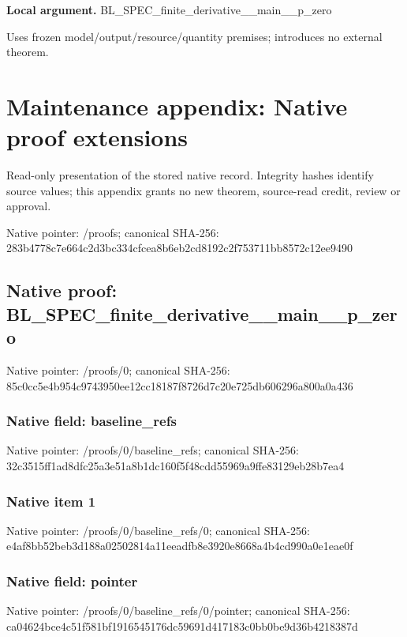 \documentclass[10pt,a4paper]{article}
\begin{document}
\textbf{Local argument.} BL\_\allowbreak{}SPEC\_\allowbreak{}finite\_\allowbreak{}derivative\_\allowbreak{}\_\allowbreak{}main\_\allowbreak{}\_\allowbreak{}p\_\allowbreak{}zero

Uses frozen model/output/resource/quantity premises; introduces no external theorem.

\section{Maintenance appendix: Native proof extensions}
Read-only presentation of the stored native record. Integrity hashes identify source values; this appendix grants no new theorem, source-read credit, review or approval.

Native pointer: /proofs; canonical SHA-256: 283b4778c7e664c2d3bc334cfcea8b6eb2cd8192c2f753711bb8572c12ee9490

\subsection{Native proof: BL\_\allowbreak{}SPEC\_\allowbreak{}finite\_\allowbreak{}derivative\_\allowbreak{}\_\allowbreak{}main\_\allowbreak{}\_\allowbreak{}p\_\allowbreak{}zero}
Native pointer: /proofs/0; canonical SHA-256: 85c0cc5e4b954c9743950ee12cc18187f8726d7c20e725db606296a800a0a436

\subsubsection{Native field: baseline\_\allowbreak{}refs}
Native pointer: /proofs/0/baseline\_\allowbreak{}refs; canonical SHA-256: 32c3515ff1ad8dfc25a3e51a8b1dc160f5f48cdd55969a9ffe83129eb28b7ea4

\subsubsection{Native item 1}
Native pointer: /proofs/0/baseline\_\allowbreak{}refs/0; canonical SHA-256: e4af8bb52beb3d188a02502814a11eeadfb8e3920e8668a4b4cd990a0e1eae0f

\subsubsection{Native field: pointer}
Native pointer: /proofs/0/baseline\_\allowbreak{}refs/0/pointer; canonical SHA-256: ca04624bce4c51f581bf1916545176dc59691d417183c0bb0be9d36b4218387d
\end{document}
